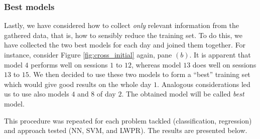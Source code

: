 %
%

\subsubsection{Best models}

Lastly, we have considered how to collect \emph{only} relevant
information from the gathered data, that is, how to sensibly reduce
the training set. To do this, we have collected the two best models
for each day and joined them together. For instance, consider Figure
\ref{fig:cross_initial} again, pane $(b)$. It is apparent that model
$4$ performs well on sessions $1$ to $12$, whereas model $13$ does
well on sessions $13$ to $15$. We then decided to use these two models
to form a ``best'' training set which would give good results on the
whole day $1$. Analogous considerations led us to use also models $4$
and $8$ of day $2$. The obtained model will be called \emph{best}
model.

This procedure was repeated for each problem tackled
(classification, regression) and approach tested (NN, SVM, and
LWPR). The results are presented below.
